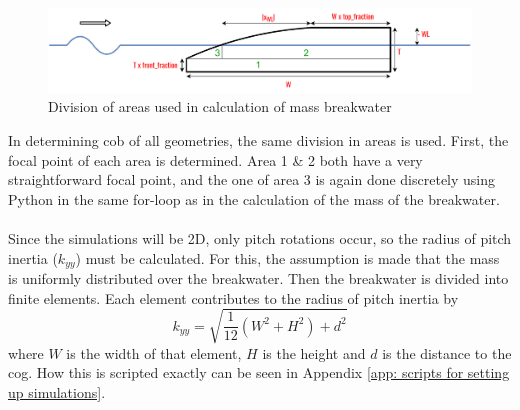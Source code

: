 \begin{figure}[h]
    \centering
    \includegraphics[width=\linewidth]{figures/Methodology/parametrisation_areas.pdf}
    \caption{Division of areas used in calculation of mass breakwater}
    \label{fig: Figure for mass calculation}
\end{figure}

In determining \acrfull{cob} of all geometries, the same division in areas is used. First, the focal point of each area is determined. Area 1 \& 2 both have a very straightforward focal point, and the one of area 3 is again done discretely using Python in the same for-loop as in the calculation of the mass of the breakwater. \\
\\
Since the simulations will be 2D, only pitch rotations occur, so the radius of pitch inertia ($k_{yy}$) must be calculated. For this, the assumption is made that the mass is uniformly distributed over the breakwater. Then the breakwater is divided into finite elements. Each element contributes to the radius of pitch inertia by
\begin{equation}
    k_{yy} = \sqrt{\frac{1}{12}(W^2 + H^2) + d^2}
\end{equation}
where $W$ is the width of that element, $H$ is the height and $d$ is the distance to the \acrfull{cog}. How this is scripted exactly can be seen in Appendix \ref{app: scripts for setting up simulations}.

